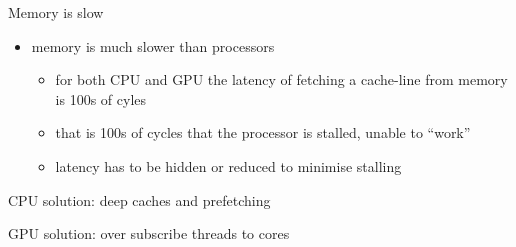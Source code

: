 \documentclass[aspectratio=43]{beamer}
\newcommand{\todo}[1]{{\color{red}{#1}}}
\begin{document}
\begin{frame}[fragile]{}
    \begin{info}{Memory is slow}
        \begin{itemize}
            \item memory is much slower than processors
            \begin{itemize}
                \item for both CPU and GPU the latency of fetching a cache-line from memory is 100s of cyles
                \item that is 100s of cycles that the processor is stalled, unable to ``work''
                \item latency has to be hidden or reduced to minimise stalling
            \end{itemize}
        \end{itemize}
    \end{info}
    \begin{info}{CPU solution: deep caches and prefetching}
        \todo{image from NVIDIA}
    \end{info}
    \begin{info}{GPU solution: over subscribe threads to cores}
        \todo{image from NVIDIA}
    \end{info}
\end{frame}
\end{document}
